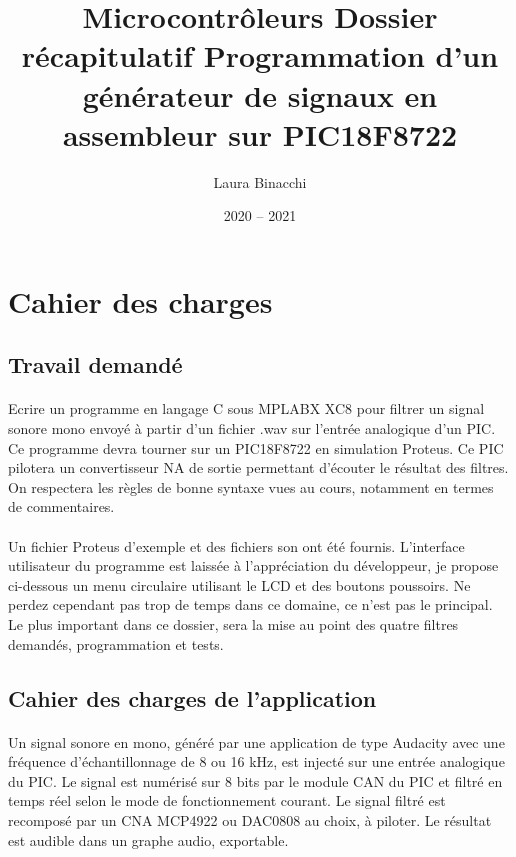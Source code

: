 \documentclass{article}
\title{Microcontrôleurs\bigbreak \bigbreak
    \large Dossier récapitulatif\bigbreak
    \normalsize Programmation d'un générateur de signaux en assembleur sur PIC18F8722\bigbreak}
\date{2020 -- 2021}
\author{Laura Binacchi}
\begin{document}
    
    \newpage
    \tableofcontents
    \newpage

    \section{Cahier des charges}

    \subsection{Travail demandé}
    \paragraph{}
    Ecrire un programme en langage C sous MPLABX XC8 pour filtrer un signal sonore mono envoyé à partir d’un fichier .wav sur l’entrée analogique d’un PIC. Ce programme devra tourner sur un PIC18F8722 en simulation Proteus. Ce PIC pilotera un convertisseur NA de sortie permettant d’écouter le résultat des filtres. On respectera les règles de bonne syntaxe vues au cours, notamment en termes de commentaires.

    \paragraph{}
    Un fichier Proteus d’exemple et des fichiers son ont été fournis. L’interface utilisateur du programme est laissée à l’appréciation du développeur, je propose ci-dessous un menu circulaire utilisant le LCD et des boutons poussoirs. Ne perdez cependant pas trop de temps dans ce domaine, ce n’est pas le principal. Le plus important dans ce dossier, sera la mise au point des quatre filtres demandés, programmation et tests.

    \subsection{Cahier des charges de l’application}
    \paragraph{}
    Un signal sonore en mono, généré par une application de type Audacity avec une fréquence d’échantillonnage de 8 ou 16 kHz, est injecté sur une entrée analogique du PIC. Le signal est numérisé sur 8 bits par le module CAN du PIC et filtré en temps réel selon le mode de fonctionnement courant. Le signal filtré est recomposé par un CNA MCP4922 ou DAC0808 au choix, à piloter. Le résultat est audible dans un graphe audio, exportable.
\end{document}
